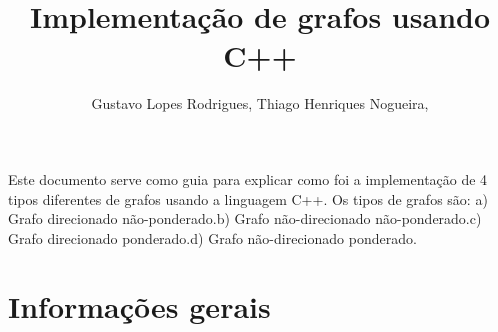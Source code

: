 \documentclass[12pt]{article}
\title{Implementação de grafos usando C++}
\author{Gustavo Lopes Rodrigues\inst{1}, Thiago Henriques Nogueira\inst{2},}
\begin{document}
 

\maketitle

\begin{resumo} 
  Este documento serve como guia para explicar como 
  foi a implementação
  de 4 tipos diferentes de grafos usando a linguagem C++. Os tipos de 
  grafos são: a) Grafo direcionado não-ponderado.b) Grafo não-direcionado 
  não-ponderado.c) Grafo direcionado ponderado.d) Grafo não-direcionado 
  ponderado.
\end{resumo}


\section{Informações gerais}
\end{document}
